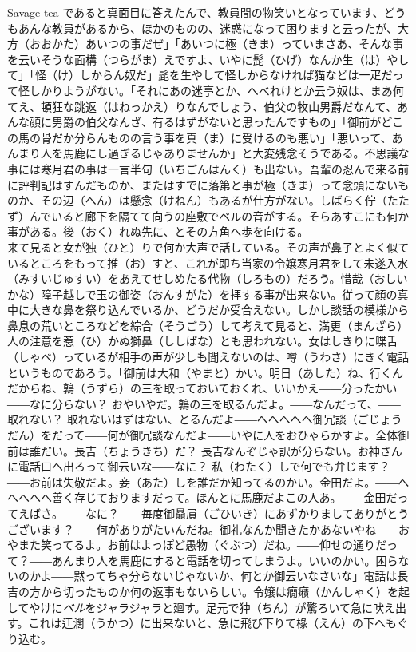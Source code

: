 \documentclass{book}
\begin{document}
Savage tea
であると真面目に答えたんで、教員間の物笑いとなっています、どうもあんな教員があるから、ほかのものの、迷惑になって困りますと云ったが、大方（おおかた）あいつの事だぜ」「あいつに極（きま）っていまさあ、そんな事を云いそうな面構（つらがま）えですよ、いやに髭（ひげ）なんか生（は）やして」「怪（け）しからん奴だ」髭を生やして怪しからなければ猫などは一疋だって怪しかりようがない。「それにあの迷亭とか、へべれけとか云う奴は、まあ何てえ、頓狂な跳返（はねっかえ）りなんでしょう、伯父の牧山男爵だなんて、あんな顔に男爵の伯父なんざ、有るはずがないと思ったんですもの」「御前がどこの馬の骨だか分らんものの言う事を真（ま）に受けるのも悪い」「悪いって、あんまり人を馬鹿にし過ぎるじゃありませんか」と大変残念そうである。不思議な事には寒月君の事は一言半句（いちごんはんく）も出ない。吾輩の忍んで来る前に評判記はすんだものか、またはすでに落第と事が極（きま）って念頭にないものか、その辺（へん）は懸念（けねん）もあるが仕方がない。しばらく佇（たたず）んでいると廊下を隔てて向うの座敷でベルの音がする。そらあすこにも何か事がある。後（おく）れぬ先に、とその方角へ歩を向ける。\\
来て見ると女が独（ひと）りで何か大声で話している。その声が鼻子とよく似ているところをもって推（お）すと、これが即ち当家の令嬢寒月君をして未遂入水（みすいじゅすい）をあえてせしめたる代物（しろもの）だろう。惜哉（おしいかな）障子越しで玉の御姿（おんすがた）を拝する事が出来ない。従って顔の真中に大きな鼻を祭り込んでいるか、どうだか受合えない。しかし談話の模様から鼻息の荒いところなどを綜合（そうごう）して考えて見ると、満更（まんざら）人の注意を惹（ひ）かぬ獅鼻（ししばな）とも思われない。女はしきりに喋舌（しゃべ）っているが相手の声が少しも聞えないのは、噂（うわさ）にきく電話というものであろう。「御前は大和（やまと）かい。明日（あした）ね、行くんだからね、鶉（うずら）の三を取っておいておくれ、いいかえ――分ったかい――なに分らない？ おやいやだ。鶉の三を取るんだよ。――なんだって、――取れない？ 取れないはずはない、とるんだよ――へへへへへ御冗談（ごじょうだん）をだって――何が御冗談なんだよ――いやに人をおひゃらかすよ。全体御前は誰だい。長吉（ちょうきち）だ？ 長吉なんぞじゃ訳が分らない。お神さんに電話口へ出ろって御云いな――なに？ 私（わたく）しで何でも弁じます？――お前は失敬だよ。妾（あた）しを誰だか知ってるのかい。金田だよ。――へへへへへ善く存じておりますだって。ほんとに馬鹿だよこの人あ。――金田だってえばさ。――なに？――毎度御贔屓（ごひいき）にあずかりましてありがとうございます？――何がありがたいんだね。御礼なんか聞きたかあないやね――おやまた笑ってるよ。お前はよっぽど愚物（ぐぶつ）だね。――仰せの通りだって？――あんまり人を馬鹿にすると電話を切ってしまうよ。いいのかい。困らないのかよ――黙ってちゃ分らないじゃないか、何とか御云いなさいな」電話は長吉の方から切ったものか何の返事もないらしい。令嬢は癇癪（かんしゃく）を起してやけに\emph{ベル}をジャラジャラと廻す。足元で狆（ちん）が驚ろいて急に吠え出す。これは迂濶（うかつ）に出来ないと、急に飛び下りて椽（えん）の下へもぐり込む。\\
\end{document}
